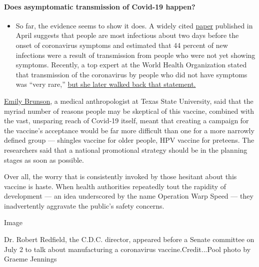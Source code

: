 \begin{itemize}
{  \paragraph{Does asymptomatic transmission of Covid-19
  happen?}\label{does-asymptomatic-transmission-of-covid-19-happen}}

  \begin{itemize}
  \tightlist
  \item
    So far, the evidence seems to show it does. A widely cited
    \href{https://www.nature.com/articles/s41591-020-0869-5}{paper}
    published in April suggests that people are most infectious about
    two days before the onset of coronavirus symptoms and estimated that
    44 percent of new infections were a result of transmission from
    people who were not yet showing symptoms. Recently, a top expert at
    the World Health Organization stated that transmission of the
    coronavirus by people who did not have symptoms was ``very rare,''
    \href{https://www.nytimes3xbfgragh.onion/2020/06/09/world/coronavirus-updates.html?action=click\&pgtype=Article\&state=default\&region=MAIN_CONTENT_3\&context=storylines_faq\#link-1f302e21}{but
    she later walked back that statement.}
  \end{itemize}
\end{itemize}

\href{https://www.txstate.edu/anthropology/people/faculty/brunson.html}{Emily
Brunson}, a medical anthropologist at Texas State University, said that
the myriad number of reasons people may be skeptical of this vaccine,
combined with the vast, unsparing reach of Covid-19 itself, meant that
creating a campaign for the vaccine's acceptance would be far more
difficult than one for a more narrowly defined group --- shingles
vaccine for older people, HPV vaccine for preteens. The researchers said
that a national promotional strategy should be in the planning stages as
soon as possible.

Over all, the worry that is consistently invoked by those hesitant about
this vaccine is haste. When health authorities repeatedly tout the
rapidity of development --- an idea underscored by the name Operation
Warp Speed --- they inadvertently aggravate the public's safety
concerns.

Image

Dr. Robert Redfield, the C.D.C. director, appeared before a Senate
committee on July 2 to talk about manufacturing a coronavirus
vaccine.Credit...Pool photo by Graeme Jennings

